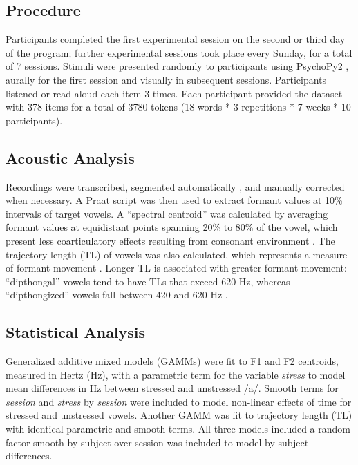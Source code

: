 \documentclass[
  a4paper,
  11pt,
  twocolumn]{article}
\begin{document}
\subsection{Procedure}

Participants completed the first experimental session on the second or
third day of the program; further experimental sessions took place every
Sunday, for a total of 7 sessions. Stimuli were presented randomly to
participants using PsychoPy2 \cite{peirce2019psychopy2}, aurally for the
first session and visually in subsequent sessions. Participants listened
or read aloud each item 3 times. Each participant provided the dataset
with 378 items for a total of 3780 tokens (18 words * 3 repetitions * 7
weeks * 10 participants).

\subsection{Acoustic Analysis}

Recordings were transcribed, segmented automatically
\cite{mcauliffe26_interspeech}, and manually corrected when necessary. A
Praat script \cite{vargo2025praat} was then used to extract formant
values at 10\% intervals of target vowels. A ``spectral centroid'' was
calculated by averaging formant values at equidistant points spanning
20\% to 80\% of the vowel, which present less coarticulatory effects
resulting from consonant environment
\cite{jacewicz2011vowel,coretta2025tutorial}. The trajectory length (TL)
of vowels was also calculated, which represents a measure of formant
movement \cite{fox2009cross}. Longer TL is associated with greater
formant movement: ``dipthongal'' vowels tend to have TLs that exceed 620
Hz, whereas ``dipthongized'' vowels fall between 420 and 620 Hz
\cite{jacewicz2011regional}.

\subsection{Statistical Analysis}

Generalized additive mixed models (GAMMs)
\cite{soskuthy2017generalised,coretta2025tutorial} were fit to F1 and F2
centroids, measured in Hertz (Hz), with a parametric term for the
variable \emph{stress} to model mean differences in Hz between stressed
and unstressed /a/. Smooth terms for \emph{session} and \emph{stress} by
\emph{session} were included to model non-linear effects of time for
stressed and unstressed vowels. Another GAMM was fit to trajectory
length (TL) with identical parametric and smooth terms. All three models
included a random factor smooth by subject over session was included to
model by-subject differences.
\end{document}
